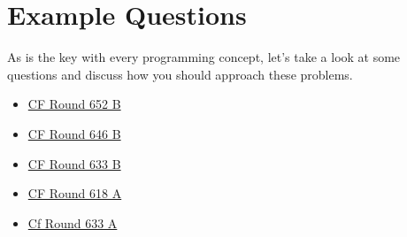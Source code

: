 \documentclass{article}
\begin{document}
\section{Example Questions}
    As is the key with every programming concept, let's take a look at some questions and discuss how you should approach these problems.
    \begin{itemize}
        \item \href{https://codeforces.com/contest/1369/problem/B}{CF Round 652 B}
        \item \href{https://codeforces.com/contest/1363/problem/B}{CF Round 646 B}
        \item \href{https://codeforces.com/contest/1339/problem/B}{CF Round 633 B}
        \item \href{https://codeforces.com/contest/1300/problem/A}{CF Round 618 A}
        \item \href{https://codeforces.com/contest/1339/problem/A}{Cf Round 633 A}
    \end{itemize}
\end{document}
